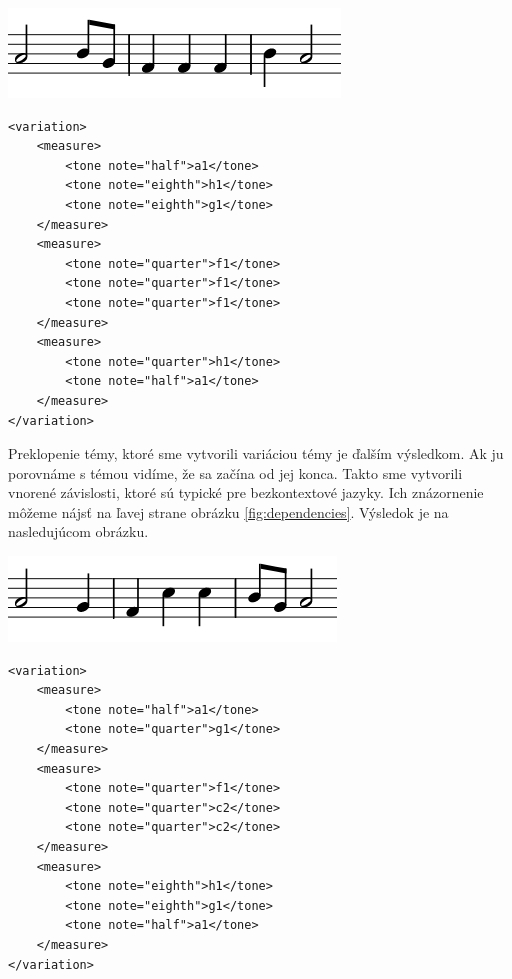 \begin{minipage}{.45\textwidth}
\includegraphics[width=\textwidth]{thesis/obrazky-figures/var5.png}
\end{minipage}%
\begin{minipage}{.5\textwidth}
\centering
\lstset{language=XML}
\begin{lstlisting}[basicstyle=\tiny]
<variation>
    <measure>
        <tone note="half">a1</tone>
        <tone note="eighth">h1</tone>
        <tone note="eighth">g1</tone>
    </measure>
    <measure>
        <tone note="quarter">f1</tone>
        <tone note="quarter">f1</tone>
        <tone note="quarter">f1</tone>
    </measure>
    <measure>
        <tone note="quarter">h1</tone>
        <tone note="half">a1</tone>
    </measure>
</variation>
\end{lstlisting}
\end{minipage}

Preklopenie témy, ktoré sme vytvorili variáciou témy je ďalším výsledkom. Ak ju porovnáme s témou vidíme, že sa začína od jej konca. Takto sme vytvorili vnorené závislosti, ktoré sú typické pre bezkontextové jazyky. Ich znázornenie môžeme nájsť na ľavej strane obrázku \ref{fig:dependencies}. Výsledok je na nasledujúcom obrázku.

\begin{minipage}{.45\textwidth}
\includegraphics[width=\textwidth]{thesis/obrazky-figures/var7.png}
\end{minipage}%
\begin{minipage}{.5\textwidth}
\centering
\lstset{language=XML}
\begin{lstlisting}[basicstyle=\tiny]
<variation>
    <measure>
        <tone note="half">a1</tone>
        <tone note="quarter">g1</tone>
    </measure>
    <measure>
        <tone note="quarter">f1</tone>
        <tone note="quarter">c2</tone>
        <tone note="quarter">c2</tone>
    </measure>
    <measure>
        <tone note="eighth">h1</tone>
        <tone note="eighth">g1</tone>
        <tone note="half">a1</tone>
    </measure>
</variation>
\end{lstlisting}
\end{minipage}

